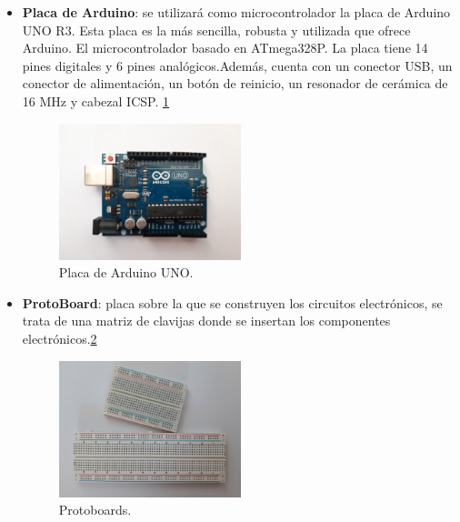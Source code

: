 \begin{itemize}
\item \textbf{Placa de Arduino}\cite{Arduino1,Arduino2}: se utilizará como microcontrolador la placa de Arduino UNO R3. Esta placa es la más sencilla, robusta y utilizada que ofrece Arduino. El microcontrolador basado en ATmega328P. La placa tiene 14 pines digitales y 6 pines analógicos.Además, cuenta con un conector USB, un conector de alimentación, un botón de reinicio, un resonador de cerámica de 16 MHz y cabezal ICSP. \ref{fig:arduino}
\begin{figure}[h!]
    \centering
    \includegraphics[width=0.5\textwidth]{img/imgArduinoUNO.jpg}
    \caption{Placa de Arduino UNO.}
    \label{fig:arduino} %
\end{figure}

\item \textbf{ProtoBoard}: placa sobre la que se construyen los circuitos electrónicos, se trata de una matriz de clavijas donde se insertan los componentes electrónicos.\ref{fig:protoboard}
\begin{figure}[h!]
    \centering
    \includegraphics[width=0.5\textwidth]{img/imgProtoboards.jpg}
    \caption{Protoboards.}
    \label{fig:protoboard} %
\end{figure}


\end{itemize}

